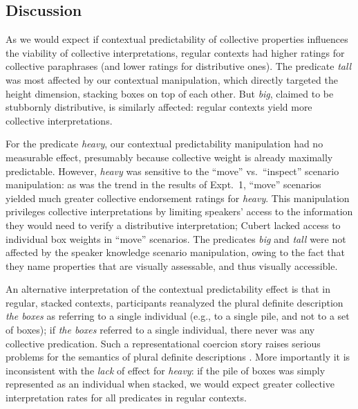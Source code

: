 \documentclass[preprint,12pt,authoryear,titlepage]{elsarticle}
\begin{document}

\subsection{Discussion}

As we would expect if contextual predictability of collective properties influences the viability of collective interpretations, regular contexts had higher ratings for collective paraphrases (and lower ratings for distributive ones). The predicate \textit{tall} was most affected by our contextual manipulation, which directly targeted the height dimension, stacking boxes on top of each other. But \emph{big}, claimed to be stubbornly distributive, is similarly affected: regular contexts yield more collective interpretations. 

For the predicate \emph{heavy}, our contextual predictability manipulation had no measurable effect, presumably because collective weight is already maximally predictable. However, \emph{heavy} was sensitive to the ``move'' vs.~``inspect'' scenario manipulation: as was the trend in the results of Expt.~1, ``move'' scenarios yielded much greater collective endorsement ratings for \emph{heavy}. This manipulation privileges collective interpretations by limiting speakers' access to the information they would need to verify a distributive interpretation; Cubert lacked access to individual box weights in ``move'' scenarios. The predicates \emph{big} and \emph{tall} were not affected by the speaker knowledge scenario manipulation, owing to the fact that they name properties that are visually assessable, and thus visually accessible.

An alternative interpretation of the contextual predictability effect is that in regular, stacked contexts, participants reanalyzed the plural definite description \emph{the boxes} as referring to a single individual (e.g., to a single pile, and not to a set of boxes); if \emph{the boxes} referred to a single individual, there never was any collective predication.
Such a representational coercion story raises serious problems for the semantics of plural definite descriptions \citep[for discussion, see ][]{link1983,landman1989,schwarzschild1996,link1998}. More importantly it is inconsistent with the \emph{lack} of effect for \emph{heavy}: if the pile of boxes was simply represented as an individual when stacked, we would expect greater collective interpretation rates for all predicates in regular contexts.
\end{document}
